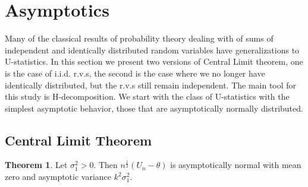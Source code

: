 \documentclass{article}
\theoremstyle{definition}
\newtheorem{theorem}{Theorem}
\numberwithin{Def}{section}
\begin{document}
    
    
    \section{Asymptotics} 
    Many of the classical results of probability theory dealing with of sums of independent and identically distributed random variables have generalizations to U-statistics. In this section we present two versions of Central Limit theorem, one is the case of i.i.d. r.v.s, the second is the case where we no longer have identically distributed, but the r.v.s still remain independent. 
    The main tool for this study is H-decomposition. We start with the class of U-statistics with the simplest asymptotic behavior, those that are asymptotically normally distributed. 
    \subsection{Central Limit Theorem}
    \begin{theorem}
    Let $\sigma_1^{2} > 0$. Then $n^{\frac{1}{2}}(U_n - \theta)$ is asymptotically normal with mean zero and asymptotic variance $k^2 \sigma_1^2$.
    \end{theorem}
    
\end{document}
